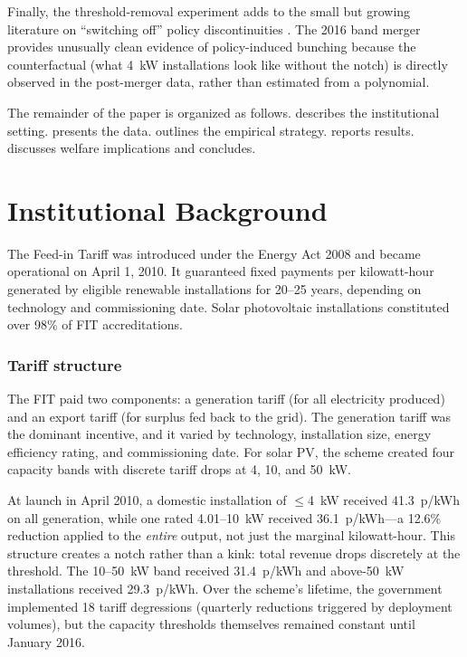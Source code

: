 \documentclass[12pt]{article}
\begin{document}
Finally, the threshold-removal experiment adds to the small but growing literature on ``switching off'' policy discontinuities \citep{kleven2019, benzarti2020}. The 2016 band merger provides unusually clean evidence of policy-induced bunching because the counterfactual (what 4~kW installations look like without the notch) is directly observed in the post-merger data, rather than estimated from a polynomial.

The remainder of the paper is organized as follows.  describes the institutional setting.  presents the data.  outlines the empirical strategy.  reports results.  discusses welfare implications and  concludes.


\section{Institutional Background}
\label{sec:background}

The Feed-in Tariff was introduced under the Energy Act 2008 and became operational on April 1, 2010. It guaranteed fixed payments per kilowatt-hour generated by eligible renewable installations for 20--25 years, depending on technology and commissioning date. Solar photovoltaic installations constituted over 98\% of FIT accreditations.

\subsubsection*{Tariff structure} The FIT paid two components: a generation tariff (for all electricity produced) and an export tariff (for surplus fed back to the grid). The generation tariff was the dominant incentive, and it varied by technology, installation size, energy efficiency rating, and commissioning date. For solar PV, the scheme created four capacity bands with discrete tariff drops at 4, 10, and 50~kW.

At launch in April 2010, a domestic installation of $\leq$4~kW received 41.3~p/kWh on all generation, while one rated 4.01--10~kW received 36.1~p/kWh---a 12.6\% reduction applied to the \textit{entire} output, not just the marginal kilowatt-hour. This structure creates a notch rather than a kink: total revenue drops discretely at the threshold. The 10--50~kW band received 31.4~p/kWh and above-50~kW installations received 29.3~p/kWh. Over the scheme's lifetime, the government implemented 18 tariff degressions (quarterly reductions triggered by deployment volumes), but the capacity thresholds themselves remained constant until January 2016.
\end{document}
